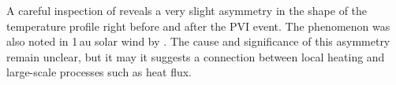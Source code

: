         A careful inspection of  reveals a very slight asymmetry in the shape
        of the temperature profile right before and after the PVI event. The phenomenon was also
        noted in 1\,au solar wind by \citep{Osman2012a}. The cause and significance of this
        asymmetry remain unclear, but it may it suggests a connection between local heating and
        large-scale processes such as heat flux.